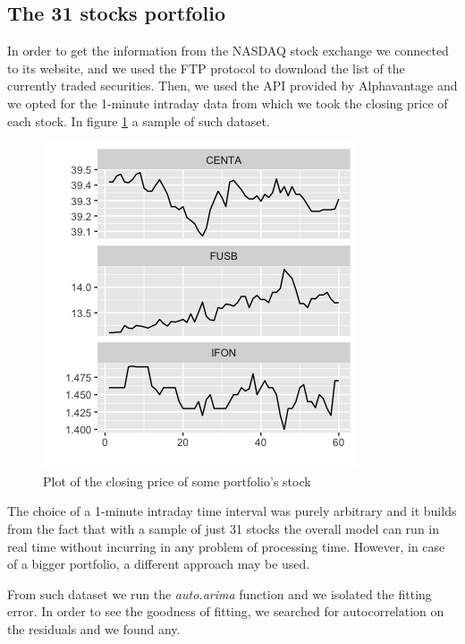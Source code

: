\documentclass[twocolumn]{article}
\begin{document}
\subsection{The 31 stocks portfolio}
In order to get the information from the NASDAQ stock exchange we connected to its website, and we used the FTP protocol to download the list of the currently traded securities. Then, we used the API provided by Alphavantage \cite{_alpha_} and we opted for the 1-minute intraday data from which we took the closing price of each stock. In figure \ref{portfolio} a sample of such dataset.

\begin{figure}
    \centering
    \includegraphics[width=1\linewidth, ]{Paper/images/Rplot.png}
    \caption{Plot of the closing price of some portfolio's stock}
    \label{portfolio}
\end{figure}

The choice of a 1-minute intraday time interval was purely arbitrary and it builds from the fact that with a sample of just 31 stocks the overall model can run in real time without incurring in any problem of processing time. However, in case of a bigger portfolio, a different approach may be used.

From such dataset we run the \textit{auto.arima} function and we isolated the fitting error. In order to see the goodness of fitting, we searched for autocorrelation on the residuals and we found any.
\end{document}
